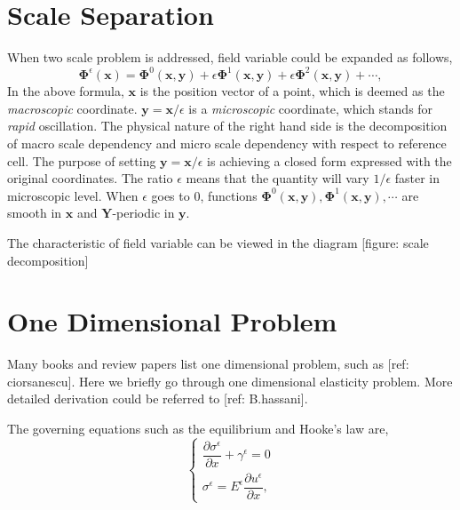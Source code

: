 \section{Scale Separation}
When two scale problem is addressed, field variable could be expanded as follows, 
%
\begin{equation}
\label{eq:field epsi}
\mathbf{\Phi}^{\epsilon}(\mathbf{x}) = \mathbf{\Phi}^{0}(\mathbf{x},\mathbf{y}) + \epsilon\mathbf{\Phi}^{1}(\mathbf{x},\mathbf{y}) + \epsilon\mathbf{\Phi}^{2}(\mathbf{x},\mathbf{y}) + \cdots,
\end{equation}
%
In the above formula, $\mathbf{x}$ is the position vector of a point, which is deemed as the \textit{macroscopic} coordinate. $\mathbf{y}=\mathbf{x}/\epsilon$ is a \textit{microscopic} coordinate, which stands for \textit{rapid} oscillation. The physical nature of the right hand side is the decomposition of macro scale dependency and micro scale dependency with respect to reference cell. The purpose of setting $\mathbf{y}=\mathbf{x}/\epsilon$ is achieving a closed form expressed with the original coordinates. The ratio $\epsilon$ means that the quantity will vary $1/\epsilon$ faster in microscopic level. When $\epsilon$ goes to $0$, functions $\mathbf{\Phi}^{0}(\mathbf{x}, \mathbf{y}), \mathbf{\Phi}^{1}(\mathbf{x}, \mathbf{y}), \cdots$ are smooth in $\mathbf{x}$ and $\mathbf{Y}$-periodic in $\mathbf{y}$.

The characteristic of field variable can be viewed in the diagram [figure: scale decomposition]

\section{One Dimensional Problem}
Many books and review papers list one dimensional problem, such as [ref: ciorsanescu]. Here we briefly go through one dimensional elasticity problem. More detailed derivation could be referred to [ref: B.hassani].

The governing equations such as the equilibrium and Hooke's law are,
\begin{equation}
\left\{
\begin{array}{l}
\dfrac{\partial \sigma^{\epsilon}}{\partial x} + \gamma^{\epsilon} = 0 \\
\sigma^{\epsilon} = E^{\epsilon} \dfrac{\partial u^{\epsilon}}{\partial x},
\end{array}
\right.
\end{equation}

